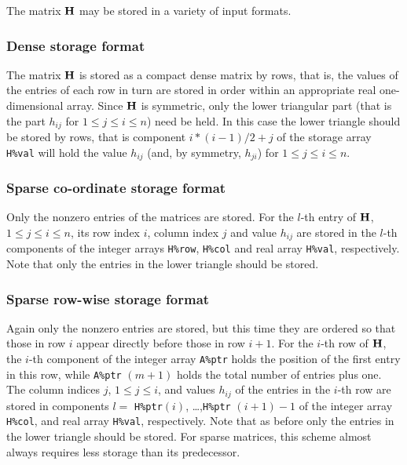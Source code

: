 \documentclass{galahad}
\begin{document}

\galmatrix
The matrix ${\mathbf{H}}$ may be stored in a variety of input formats.

\subsubsection{Dense storage format}\label{dense}
The matrix ${\mathbf{H}}$ is stored as a compact
dense matrix by rows, that is, the values of the entries of each row in turn are
stored in order within an appropriate real one-dimensional array.
Since ${\mathbf{H}}$ is symmetric, only the lower triangular part (that is the part
$h_{ij}$ for $1 \leq j \leq i \leq n$) need be held. In this case
the lower triangle should be stored by rows, that is
component $i \ast (i-1)/2 + j$ of the storage array {\tt H\%val}
will hold the value $h_{ij}$ (and, by symmetry, $h_{ji}$)
for $1 \leq j \leq i \leq n$.

\subsubsection{Sparse co-ordinate storage format}\label{coordinate}
Only the nonzero entries of the matrices are stored.
For the $l$-th entry of ${\mathbf{H}}$, $1 \leq j \leq i \leq n$,
its row index $i$, column index $j$ and value $h_{ij}$
are stored in the $l$-th components of the integer arrays {\tt H\%row},
{\tt H\%col} and real array {\tt H\%val}, respectively.
Note that only the entries in the lower triangle should be stored.

\subsubsection{Sparse row-wise storage format}\label{rowwise}
Again only the nonzero entries are stored, but this time
they are ordered so that those in row $i$ appear directly before those
in row $i+1$. For the $i$-th row of ${\mathbf{H}}$, the $i$-th component of the
integer array {\tt A\%ptr} holds the position of the first entry in this row,
while {\tt A\%ptr} $(m+1)$ holds the total number of entries plus one.
The column indices $j$, $1 \leq j \leq i$, and values $h_{ij}$ of the
entries in the $i$-th row are stored in components
$l =$ {\tt H\%ptr}$(i)$, \ldots ,{\tt H\%ptr} $(i+1)-1$ of the
integer array {\tt H\%col}, and real array {\tt H\%val}, respectively.
Note that as before only the entries in the lower triangle should be stored.
For sparse matrices, this scheme almost always requires less storage than
its predecessor.
\end{document}
